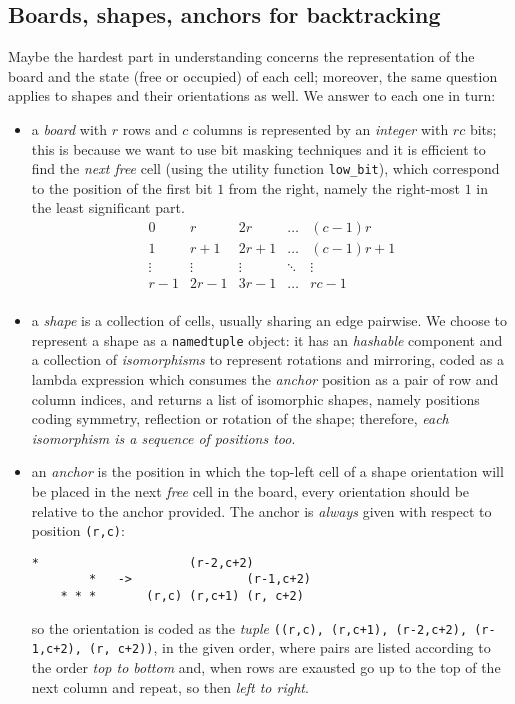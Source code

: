 \subsection{Boards, shapes, anchors for backtracking}

Maybe the hardest part in understanding concerns the representation of the board and
the state (free or occupied) of each cell; moreover, the same question applies
to shapes and their orientations as well. We answer to each one in turn:
\begin{itemize}
    \item a \textit{board} with $r$ rows and $c$ columns is represented by an
    \textit{integer} with $rc$ bits; this is because we want to use bit masking
    techniques and it is efficient to find the \textit{next free} cell (using
    the utility function \verb|low_bit|), which correspond to the position of
    the first bit $1$ from the right, namely the right-most $1$ in the least
    significant part.
    \begin{displaymath}
    \begin{array}{c|c|c|c|c}
    0 & r & 2r & \ldots & (c-1)r \\
    \hline
    1 & r+1 & 2r+1 & \ldots & (c-1)r+1 \\
    \hline
    \vdots & \vdots & \vdots & \ddots & \vdots \\
    \hline
    r-1 & 2r-1 & 3r-1 & \ldots & rc-1\\
    \end{array}
    \end{displaymath}

    \item a \textit{shape} is a collection of cells, usually sharing an edge
    pairwise. We choose to represent a shape as a \verb|namedtuple| object: it
    has an \textit{hashable} component and a collection of
    \textit{isomorphisms} to represent rotations and mirroring, coded as a
    lambda expression which consumes the \textit{anchor} position as a pair of row
    and column indices, and returns a list of isomorphic shapes, namely
    positions coding symmetry, reflection or rotation of the shape; therefore,
    \textit{each isomorphism is a sequence of positions too}.

    \item an \textit{anchor} is the position in which the top-left cell of
    a shape orientation will be placed in the next \textit{free} cell in the
    board, every orientation should be relative to the anchor provided.
    The anchor is \textit{always} given with respect to position \verb|(r,c)|:
    \begin{Verbatim}[baselinestretch=0.1, fontsize=\small]
        *                     (r-2,c+2)
        *   ->                (r-1,c+2)
    * * *       (r,c) (r,c+1) (r, c+2)
    \end{Verbatim}
    so the orientation is coded as the \textit{tuple}
    \verb|((r,c), (r,c+1), (r-2,c+2), (r-1,c+2), (r, c+2))|, in the given order,
    where pairs are listed according to the order \textit{top to bottom} and,
    when rows are exausted go up to the top of the next column and repeat, so then
    \textit{left to right}.

\end{itemize}

